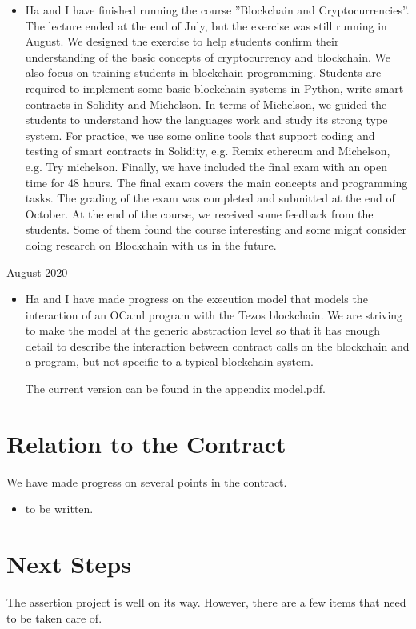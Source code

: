 \documentclass[a4paper,11pt]{article}
\begin{document}
\begin{itemize}
\item Ha and I have finished running the course ''Blockchain and Cryptocurrencies''. The lecture ended at the end of July, but the exercise was still running in August. We designed the exercise to help students confirm their understanding of the basic concepts of cryptocurrency and blockchain. We also focus on training students in blockchain programming. Students are required to implement some basic blockchain systems in Python, write smart contracts in Solidity and Michelson. In terms of Michelson, we guided the students to understand how the languages work and study its strong type system. For practice, we use some online tools that support coding and testing of smart contracts in Solidity, e.g. Remix ethereum and Michelson, e.g. Try michelson. Finally, we have included the final exam with an open time for 48 hours. The final exam covers the main concepts and programming tasks. The grading of the exam was completed and submitted at the end of October. At the end of the course, we received some feedback from the students. Some of them found the course interesting and some might consider doing research on Blockchain with us in the future.
\end{itemize}
August 2020
\begin{itemize} 
\item Ha and I have made progress on the execution model that models the interaction of an OCaml program with the Tezos blockchain. We are striving to make the model at the generic abstraction level so that it has enough detail to describe the interaction between contract calls on the blockchain and a program, but not specific to a typical blockchain system. 

The current version can be found in the appendix model.pdf.
\end{itemize}

\section{Relation to the Contract}
\label{sec:relation-contract}

We have made progress on several points in the contract.
\begin{itemize}
\item to be written.
\end{itemize}

\section{Next Steps}
\label{sec:next-steps}
The assertion project is well on its way. However, there are a few items that need to be taken care of.
\end{document}
